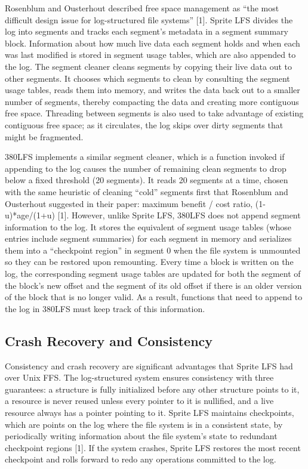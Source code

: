 \documentclass{article}
\begin{document}
Rosenblum and Ousterhout described free space management as “the most difficult design issue for log-structured file systems” [1]. Sprite LFS divides the log into segments and tracks each segment’s metadata in a segment summary block. Information about how much live data each segment holds and when each was last modified is stored in segment usage tables, which are also appended to the log. The segment cleaner cleans segments by copying their live data out to other segments. It chooses which segments to clean by consulting the segment usage tables, reads them into memory, and writes the data back out to a smaller number of segments, thereby compacting the data and creating more contiguous free space. Threading between segments is also used to take advantage of existing contiguous free space; as it circulates, the log skips over dirty segments that might be fragmented.

380LFS implements a similar segment cleaner, which is a function invoked if appending to the log causes the number of remaining clean segments to drop below a fixed threshold (20 segments). It reads 20 segments at a time, chosen with the same heuristic of cleaning “cold” segments first that Rosenblum and Ousterhout suggested in their paper: maximum benefit / cost ratio, (1-u)*age/(1+u) [1]. However, unlike Sprite LFS, 380LFS does not append segment information to the log. It stores the equivalent of segment usage tables (whose entries include segment summaries) for each segment in memory and serializes them into a “checkpoint region” in segment 0 when the file system is unmounted so they can be restored upon remounting. Every time a block is written on the log, the corresponding  segment usage tables are updated for both the segment of the block's new offset and the segment of its old offset if there is an older version of the block that is no longer valid. As a result, functions that need to append to the log in 380LFS must keep track of this information.

\subsection{Crash Recovery and Consistency}

Consistency and crash recovery are significant advantages that Sprite LFS had over Unix FFS. The log-structured system ensures consistency with three guarantees: a structure is fully initialized before any other structure points to it, a resource is never reused unless every pointer to it is nullified, and a live resource always has a pointer pointing to it. Sprite LFS maintains checkpoints, which are points on the log where the file system is in a consistent state, by periodically writing information about the file system’s state to redundant checkpoint regions [1]. If the system crashes, Sprite LFS restores the most recent checkpoint and rolls forward to redo any operations committed to the log.
\end{document}
